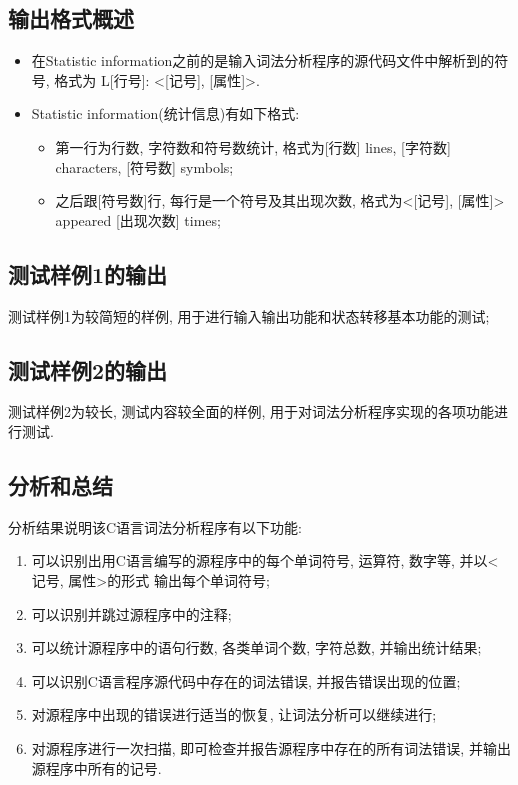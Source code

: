 \subsection{输出格式概述}
\begin{itemize}
  \item 在Statistic information之前的是输入词法分析程序的源代码文件中解析到的符号, 格式为
L[行号]: <[记号], [属性]>.
  \item Statistic information(统计信息)有如下格式:
  \begin{itemize}
    \item 第一行为行数, 字符数和符号数统计, 格式为[行数] lines, [字符数] characters,
    [符号数] symbols;
    \item 之后跟[符号数]行, 每行是一个符号及其出现次数, 格式为<[记号], [属性]> appeared
     [出现次数] times;
  \end{itemize}
\end{itemize}

\subsection{测试样例1的输出}
测试样例1为较简短的样例, 用于进行输入输出功能和状态转移基本功能的测试;

\subsection{测试样例2的输出}
测试样例2为较长, 测试内容较全面的样例, 用于对词法分析程序实现的各项功能进行测试.

\subsection{分析和总结}
分析结果说明该C语言词法分析程序有以下功能:
\begin{enumerate}
  \item 可以识别出用C语言编写的源程序中的每个单词符号, 运算符, 数字等,
  并以<记号, 属性>的形式 输出每个单词符号;
  \item 可以识别并跳过源程序中的注释;
  \item 可以统计源程序中的语句行数, 各类单词个数, 字符总数, 并输出统计结果;
  \item 可以识别C语言程序源代码中存在的词法错误, 并报告错误出现的位置;
  \item 对源程序中出现的错误进行适当的恢复, 让词法分析可以继续进行;
  \item 对源程序进行一次扫描, 即可检查并报告源程序中存在的所有词法错误, 并输出
  源程序中所有的记号.
\end{enumerate}
